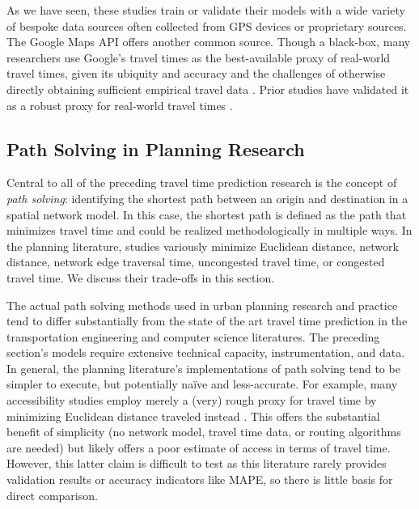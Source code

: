 \documentclass[12pt,letterpaper]{article} %
\begin{document}
As we have seen, these studies train or validate their models with a wide variety of bespoke data sources often collected from GPS devices or proprietary sources. The Google Maps API offers another common source. Though a black-box, many researchers use Google's travel times as the best-available proxy of real-world travel times, given its ubiquity and accuracy and the challenges of otherwise directly obtaining sufficient empirical travel data \citep[e.g.,][]{goudarzi2018travel,stanojevic2019mapreuse,ludwig2023traffic}. Prior studies have validated it as a robust proxy for real-world travel times \citep[e.g.,][]{wu2019comparing,wagner2020travel}.

\subsection{Path Solving in Planning Research}

Central to all of the preceding travel time prediction research is the concept of \textit{path solving}: identifying the shortest path between an origin and destination in a spatial network model. In this case, the shortest path is defined as the path that minimizes travel time and could be realized methodologically in multiple ways. In the planning literature, studies variously minimize Euclidean distance, network distance, network edge traversal time, uncongested travel time, or congested travel time. We discuss their trade-offs in this section.

The actual path solving methods used in urban planning research and practice tend to differ substantially from the state of the art travel time prediction in the transportation engineering and computer science literatures. The preceding section's models require extensive technical capacity, instrumentation, and data. In general, the planning literature's implementations of path solving tend to be simpler to execute, but potentially naïve and less-accurate. For example, many accessibility studies employ merely a (very) rough proxy for travel time by minimizing Euclidean distance traveled instead \citep[e.g.,][]{macfarlane2021modeling,pearsall2020locating}. This offers the substantial benefit of simplicity (no network model, travel time data, or routing algorithms are needed) but likely offers a poor estimate of access in terms of travel time. However, this latter claim is difficult to test as this literature rarely provides validation results or accuracy indicators like MAPE, so there is little basis for direct comparison.
\end{document}
